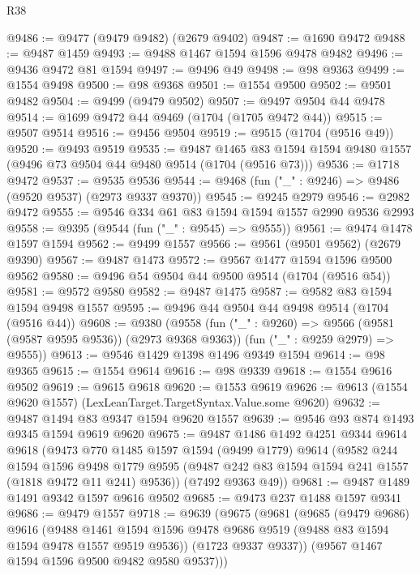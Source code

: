 \begin{lexlean}{R38}
\begin{coremodule}
@9486 := @9477 (@9479 @9482) (@2679 @9402)
@9487 := @1690 @9472
@9488 := @9487 @1459
@9493 := @9488 @1467 @1594 @1596 @9478 @9482
@9496 := @9436 @9472 @81 @1594
@9497 := @9496 @49
@9498 := @98 @9363
@9499 := @1554 @9498
@9500 := @98 @9368
@9501 := @1554 @9500
@9502 := @9501 @9482
@9504 := @9499 (@9479 @9502)
@9507 := @9497 @9504 @44 @9478
@9514 := @1699 @9472 @44 @9469 (@1704 (@1705 @9472 @44))
@9515 := @9507 @9514
@9516 := @9456 @9504
@9519 := @9515 (@1704 (@9516 @49))
@9520 := @9493 @9519
@9535 := @9487
    @1465
    @83
    @1594
    @1594
    @9480
    @1557
    (@9496 @73 @9504 @44 @9480 @9514 (@1704 (@9516 @73)))
@9536 := @1718 @9472
@9537 := @9535 @9536
@9544 := @9468 (fun ("_" : @9246) => @9486 (@9520 @9537) (@2973 @9337 @9370))
@9545 := @9245 @2979
@9546 := @2982 @9472
@9555 := @9546 @334 @61 @83 @1594 @1594 @1557 @2990 @9536 @2993
@9558 := @9395 (@9544 (fun ("_" : @9545) => @9555))
@9561 := @9474 @1478 @1597 @1594
@9562 := @9499 @1557
@9566 := @9561 (@9501 @9562) (@2679 @9390)
@9567 := @9487 @1473
@9572 := @9567 @1477 @1594 @1596 @9500 @9562
@9580 := @9496 @54 @9504 @44 @9500 @9514 (@1704 (@9516 @54))
@9581 := @9572 @9580
@9582 := @9487 @1475
@9587 := @9582 @83 @1594 @1594 @9498 @1557
@9595 := @9496 @44 @9504 @44 @9498 @9514 (@1704 (@9516 @44))
@9608 := @9380
    (@9558
      (fun ("_" : @9260) => @9566 (@9581 (@9587 @9595 @9536)) (@2973 @9368 @9363))
      (fun ("_" : @9259 @2979) => @9555))
@9613 := @9546 @1429 @1398 @1496 @9349 @1594
@9614 := @98 @9365
@9615 := @1554 @9614
@9616 := @98 @9339
@9618 := @1554 @9616 @9502
@9619 := @9615 @9618
@9620 := @1553 @9619
@9626 := @9613 (@1554 @9620 @1557) (LexLeanTarget.TargetSyntax.Value.some @9620)
@9632 := @9487 @1494 @83 @9347 @1594 @9620 @1557
@9639 := @9546 @93 @874 @1493 @9345 @1594 @9619 @9620
@9675 := @9487
    @1486
    @1492
    @4251
    @9344
    @9614
    @9618
    (@9473
      @770
      @1485
      @1597
      @1594
      (@9499 @1779)
      @9614
      (@9582
        @244
        @1594
        @1596
        @9498
        @1779
        @9595
        (@9487 @242 @83 @1594 @1594 @241 @1557 (@1818 @9472 @11 @241) @9536))
      (@7492 @9363 @49))
@9681 := @9487 @1489 @1491 @9342 @1597 @9616 @9502
@9685 := @9473 @237 @1488 @1597 @9341
@9686 := @9479 @1557
@9718 := @9639
    (@9675
      (@9681
        (@9685
          (@9479 @9686)
          @9616
          (@9488
            @1461
            @1594
            @1596
            @9478
            @9686
            @9519
            (@9488 @83 @1594 @1594 @9478 @1557 @9519 @9536))
          (@1723 @9337 @9337))
        (@9567 @1467 @1594 @1596 @9500 @9482 @9580 @9537)))

\end{coremodule}
\end{lexlean}
